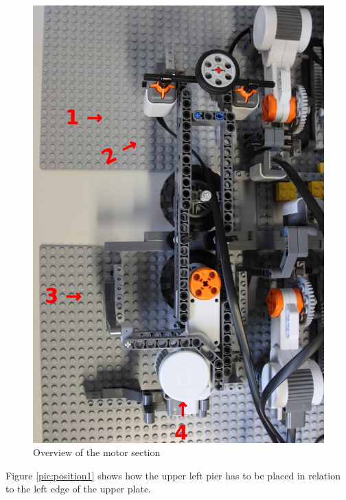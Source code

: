 \documentclass[%
  a4paper,%
  11pt,%
  blue,%
  hyperref	%
  ]{tubsartcl}
\begin{document}
\begin{figure}[!htb]
\begin{center}
\includegraphics[scale=0.28]{graphics_lego/topview.jpg}
\end{center}
\caption{Overview of the motor section}
\label{pic:topview}
\end{figure}

\clearpage

Figure \ref{pic:position1} shows how the upper left pier has to be placed in relation to the left edge of the upper plate.
\end{document}
